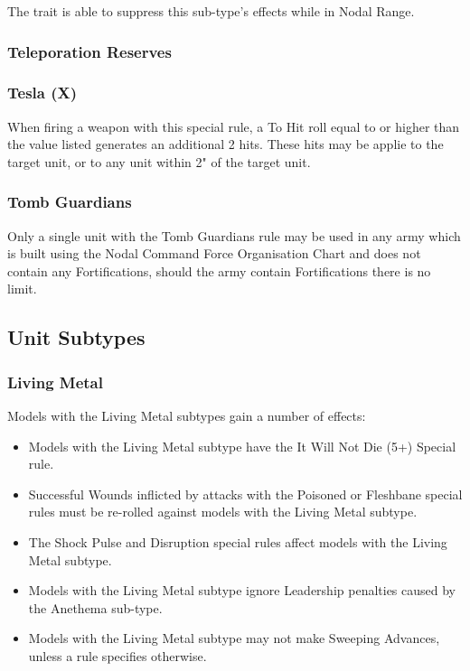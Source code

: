 The  trait is able to suppress this sub-type's effects while in Nodal Range.


\subsubsection{Teleporation Reserves} \label{Teleporation Reserves}


\subsubsection{Tesla (X)} \label{Tesla}

When firing a weapon with this special rule, a To Hit roll equal to or higher than the value listed generates an additional 2 hits. These hits may be applie to the target unit, or to any unit within 2" of the target unit.

\subsubsection{Tomb Guardians} \label{Tomb Guardians}

Only a single unit with the Tomb Guardians rule may be used in any army which is built using the Nodal Command Force Organisation Chart and does not contain any Fortifications, should the army contain Fortifications there is no limit.


\subsection{Unit Subtypes}

\subsubsection{Living Metal} \label{Living Metal}

Models with the Living Metal subtypes gain a number of effects:

\begin{itemize}
	\item Models with the Living Metal subtype have the It Will Not Die (5+) Special rule.
	\item Successful Wounds inflicted by attacks with the Poisoned or Fleshbane special rules must be re-rolled against models with the Living Metal subtype.
	\item The Shock Pulse and Disruption special rules affect models with the Living Metal subtype.
	\item Models with the Living Metal subtype ignore Leadership penalties caused by the Anethema sub-type.
	\item Models with the Living Metal subtype may not make Sweeping Advances, unless a rule specifies otherwise.
\end{itemize} 

